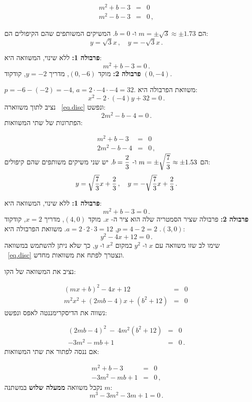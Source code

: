 \begin{eqnarray*}
m^2+b-3&=&0\\
m^2-b-3&=&0\,,
\end{eqnarray*}


הם
$m=\pm\sqrt{3}\approx \pm 1.73$
ו-%
$b=0$.
המשיקים המשותפים שהם הקיפולים הם:
\[
y=\sqrt{3}x\,,\quad y=-\sqrt{3}x\,.
\]



\textbf{פרבולה 1:}
ללא שינוי, המשוואה היא:
\[
m^2+b-3=0\,.
\]
\textbf{פרבולה 2:}
מוקד
$(0,-6)$,
מדריך
$y=-2$,
קודקוד
$(0,-4)$.

$p=-6-(-2)=-4$, $a=2\cdot -4\cdot -4=32$.
משוואת הפרבולה היא:
\[
x^2-2\cdot (-4)y +32=0\,.
\]
נציב לתוך משווארה%
~\ref{eq.disc}
ונפשט:
\[
2m^2-b-4=0\,.
\]
הפתרונות של שתי המשוואות:

\begin{eqnarray*}
m^2+b-3&=&0\\
2m^2-b-4&=&0\,,
\end{eqnarray*}
הם
$m=\pm\sqrt{\displaystyle\frac{7}{3}}\approx \pm 1.53$
ו-%
$b=\displaystyle\frac{2}{3}$.
יש שני משיקים משותפים שהם קיפולים:
\[
y=\sqrt{\displaystyle\frac{7}{3}}x+\displaystyle\frac{2}{3}\,,\quad y=-\sqrt{\displaystyle\frac{7}{3}}x+\displaystyle\frac{2}{3}\,.
\]


\textbf{פרבולה 1:}
ללא שינוי, המשוואה היא:
\[
m^2+b-3=0\,.
\]
\textbf{פרבולה 2:}
פרבולה שציר הסמטריה שלה הוא ציר ה-%
$x$.
מוקד
$(4,0)$,
מדריך
$x=2$,
קודקוד
$(3,0)$.
$p=4-2=2$, $a=2\cdot 2\cdot 3=12$.
משוואת הפרבולה היא:
\[
y^2-4x+12 = 0\,.
\]
שימו לב שזו משוואה עם 
$x$
ו-%
$y^2$
במקום
$x^2$
ו-%
$y$,
כך שלא ניתן להשתמש במשוואה%
~\ref{eq.disc}
ונצטרך לפתח את משוואות מחדש.

נציב את המשוואה של הקו:

\begin{eqnarray*}
(mx+b)^2-4x+12&=&0\\
m^2x^2+(2mb-4)x+(b^2+12)&=&0\,
\end{eqnarray*}
נשווה את הדיסקרימננטה לאפס ונפשט:

\begin{eqnarray*}
(2mb-4)^2\:-\:4m^2(b^2+12)&=&0\\
-3m^2-mb+1&=&0\,.
\end{eqnarray*}
אם ננסה לפתור את שתי המשוואות:

\begin{eqnarray*}
m^2+b-3&=&0\\
-3m^2-mb+1&=&0\,,
\end{eqnarray*}
נקבל משוואה 
\textbf{ממעלה שלוש}
במשתנה
$m$:
\begin{equation}
m^3-3m^2-3m+1=0\,.\label{eq.cubic}
\end{equation}



